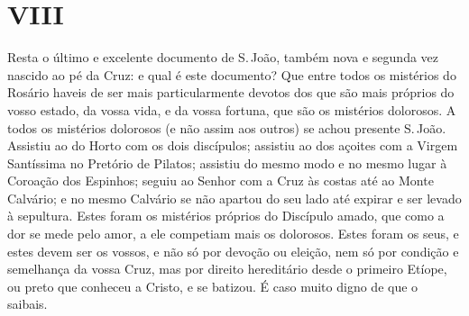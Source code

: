\section{VIII}

Resta o último e excelente documento de S.\,João, também
nova e segunda vez nascido ao pé da Cruz: e qual é este documento? Que
entre todos os mistérios do Rosário haveis de ser mais particularmente
devotos dos que são mais próprios do vosso estado, da vossa vida, e da
vossa fortuna, que são os mistérios dolorosos. A todos os mistérios
dolorosos (e não assim aos outros) se achou presente S.\,João. Assistiu
ao do Horto com os dois discípulos; assistiu ao dos açoites com a Virgem
Santíssima no Pretório de Pilatos; assistiu do mesmo modo e no mesmo
lugar à Coroação dos Espinhos; seguiu ao Senhor com a Cruz às costas até
ao Monte Calvário; e no mesmo Calvário se não apartou do seu lado até
expirar e ser levado à sepultura. Estes foram os mistérios próprios do
Discípulo amado, que como a dor se mede pelo amor, a ele competiam mais
os dolorosos. Estes foram os seus, e estes devem ser os vossos, e não só
por devoção ou eleição, nem só por condição e semelhança da vossa Cruz,
mas por direito hereditário desde o primeiro Etíope, ou preto que
conheceu a Cristo, e se batizou. É caso muito digno de que o saibais.

